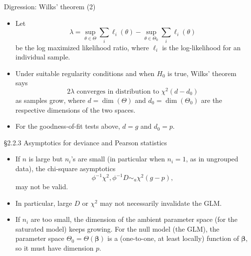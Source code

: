 \documentclass{beamer}
\newcommand{\boldbeta}{{\boldsymbol \beta}}
\newenvironment{wideitemize}%
  {\begin{itemize}%
    \setlength{\parskip}{1em}}%
  {\end{itemize}}
\begin{document}
\begin{frame}{Digression: Wilks' theorem (2) }
\begin{wideitemize}

\item Let 
\[
\lambda = \sup_{\theta \in \Theta} \sum_i \ell_i(\theta) -  \sup_{\theta \in \Theta_0} \sum_i \ell_i(\theta)
\] be the log maximized likelihood ratio, where $\ell_i$ is the log-likelihood for an individual sample.

\item Under suitable regularity conditions and when $H_0$ is true, Wilks' theorem says  
\[
2 \lambda \text{ converges in distribution to }\chi^2(d-d_0)
\]
 as samples grow, where $d = \dim (\Theta)$ and $d_0 = \dim (\Theta_0)$ are the respective dimensions of the two spaces.


\item For the goodness-of-fit tests above, $d = g$ and $d_0 = p$.




\end{wideitemize}
\end{frame}


\begin{frame}{\S2.2.3  Asymptotics for deviance and Pearson statistics  }
\begin{wideitemize}



\item
If $n$ is large but $n_i$'s are small (in particular when $n_i=1$, as in ungrouped data), the chi-square asymptotics 
\[
\phi^{-1}\chi^2, \phi^{-1}D\sim_a\chi^2(g-p),
\]
 may not be valid. 

\item In particular, large $D$ or $\chi^2$ may not necessarily invalidate the GLM.  


\item If $n_i$ are too small, the dimension of the ambient parameter space (for the saturated model)  keeps growing. For the null model (the GLM), the parameter space $\Theta_0 = \Theta(\boldbeta)$ is a (one-to-one, at least locally) function of $\boldbeta$, so it must have dimension $p$.


\end{wideitemize}
\end{frame}
\end{document}
